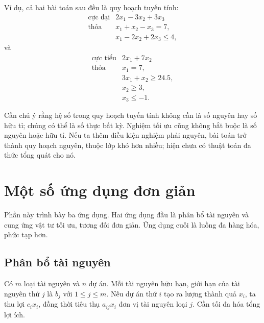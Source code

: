\documentclass[11pt]{article}
\begin{document}
Ví dụ, cả hai bài toán sau đều là quy hoạch tuyến tính:
\[
\begin{array}{ll}
\text{cực đại} & 2x_1-3x_2+3x_3\\
\text{thỏa} & x_1+x_2-x_3=7,\\
            & x_1-2x_2+2x_3\le 4,
\end{array}
\]
và
\[
\begin{array}{ll}
\text{cực tiểu} & 2x_1+7x_2\\
\text{thỏa} & x_1=7,\\
            & 3x_1+x_2\ge 24.5,\\
            & x_2\ge 3,\\
            & x_3\le -1.
\end{array}
\]

Cần chú ý rằng hệ số trong quy hoạch tuyến tính không cần là số nguyên hay
số hữu tỉ; chúng có thể là số thực bất kỳ. Nghiệm tối ưu cũng không bắt buộc
là số nguyên hoặc hữu tỉ. Nếu ta thêm điều kiện nghiệm phải nguyên, bài toán
trở thành quy hoạch nguyên, thuộc lớp khó hơn nhiều; hiện chưa có thuật toán
đa thức tổng quát cho nó.

\section{Một số ứng dụng đơn giản}

Phần này trình bày ba ứng dụng. Hai ứng dụng đầu là phân bổ tài nguyên và
cung ứng vật tư tối ưu, tương đối đơn giản. Ứng dụng cuối là luồng đa hàng
hóa, phức tạp hơn.

\subsection{Phân bổ tài nguyên}

Có $m$ loại tài nguyên và $n$ dự án. Mỗi tài nguyên hữu hạn, giới hạn của tài
nguyên thứ $j$ là $b_j$ với $1\le j\le m$. Nếu dự án thứ $i$ tạo ra lượng
thành quả $x_i$, ta thu lợi $c_ix_i$, đồng thời tiêu thụ $a_{ij}x_i$ đơn vị
tài nguyên loại $j$. Cần tối đa hóa tổng lợi ích.
\end{document}
